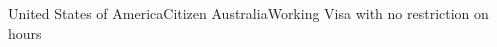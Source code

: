 
\begin{cvskills}
  \cvlang
      {United States of America}{Citizen}
      \cvlang
      {Australia}{Working Visa with no restriction on hours}
      
\end{cvskills}
